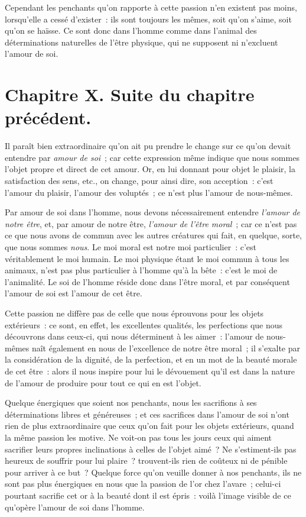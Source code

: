 \documentclass[french,twoside]{book} %
\newcommand\chapteropen{} %
\newcommand\chaptercont{} %
\newcommand\chapterclose{} %
\begin{document}
Cependant les penchants qu’on rapporte à cette passion n’en existent pas moins, lorsqu’elle a cessé d’exister : ils sont toujours les mêmes, soit qu’on s’aime, soit qu’on se haïsse. Ce sont donc dans l’homme comme dans l’animal des déterminations naturelles de l’être physique, qui ne supposent ni n’excluent l’amour de soi.
\chapterclose


\chapteropen
\chapter[{Chapitre X. Suite du chapitre précédent.}]{Chapitre X. Suite du chapitre précédent.}\renewcommand{\leftmark}{Chapitre X. Suite du chapitre précédent.}


\chaptercont
\noindent Il paraît bien extraordinaire qu’on ait pu prendre le change sur ce qu’on devait entendre par {\itshape amour de soi} ; car cette expression même indique que nous sommes l’objet propre et direct de cet amour. Or, en lui donnant pour objet le plaisir, la satisfaction des sens, etc., on change, pour ainsi dire, son acception : c’est l’amour du plaisir, l’amour des voluptés ; ce n’est plus l’amour de nous-mêmes.\par
Par amour de soi dans l’homme, nous devons nécessairement entendre {\itshape l’amour de notre être}, et, par amour de notre être, {\itshape l’amour de l’être moral} ; car ce n’est pas ce que nous avons de commun avec les autres créatures qui fait, en quelque, sorte, que nous sommes {\itshape nous}. Le moi moral est notre moi particulier : c’est véritablement le moi humain. Le moi physique étant le moi commun à tous les animaux, n’est pas plus particulier à l’homme qu’à la bête : c’est le moi de l’animalité. Le soi de l’homme réside donc dans l’être moral, et par conséquent l’amour de soi est l’amour de cet être.\par
Cette passion ne diffère pas de celle que nous éprouvons pour les objets extérieurs : ce sont, en effet, les excellentes qualités, les perfections que nous découvrons dans ceux-ci, qui nous déterminent à les aimer : l’amour de nous-mêmes naît également en nous de l’excellence de notre être moral ; il s’exalte par la considération de la dignité, de la perfection, et en un mot de la beauté morale de cet être : alors il nous inspire pour lui le dévouement qu’il est dans la nature de l’amour de produire pour tout ce qui en est l’objet.\par
Quelque énergiques que soient nos penchants, nous les sacrifions à ses déterminations libres et généreuses ; et ces sacrifices dans l’amour de soi n’ont rien de plus extraordinaire que ceux qu’on fait pour les objets extérieurs, quand la même passion les motive. Ne voit-on pas tous les jours ceux qui aiment sacrifier leurs propres inclinations à celles de l’objet aimé ? Ne s’estiment-ils pas heureux de souffrir pour lui plaire ? trouvent-ils rien de coûteux ni de pénible pour arriver à ce but ? Quelque force qu’on veuille donner à nos penchants, ils ne sont pas plus énergiques en nous que la passion de l’or chez l’avare ; celui-ci pourtant sacrifie cet or à la beauté dont il est épris : voilà l’image visible de ce qu’opère l’amour de soi dans l’homme.\par
\end{document}
